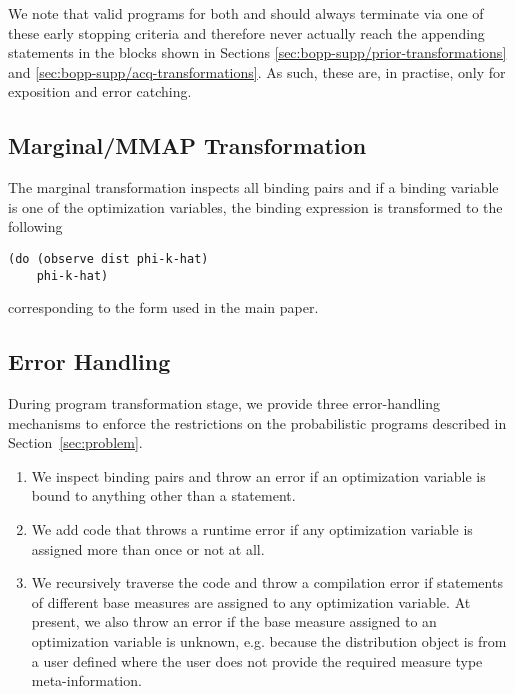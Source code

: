 We note that valid programs for both  and  should always terminate via one of these early stopping criteria and therefore never actually reach the appending statements in the  blocks shown in Sections \ref{sec:bopp-supp/prior-transformations} and \ref{sec:bopp-supp/acq-transformations}.  As such, these are, in practise, only for exposition and error catching.

\subsection{Marginal/MMAP Transformation}
The marginal transformation inspects all  binding pairs and if a binding variable  is one of the optimization variables, the binding expression  is transformed to the following
    \begin{lstlisting}[basicstyle=\footnotesize\ttfamily]
(do (observe dist phi-k-hat)
    phi-k-hat)
    \end{lstlisting}
corresponding to the  form used in the main paper.

\subsection{Error Handling}
During program transformation stage, we provide three error-handling mechanisms to enforce the restrictions on the probabilistic programs described in Section~\ref{sec:problem}.
\begin{enumerate}
    \item We inspect  binding pairs and throw an error if an optimization variable is bound to anything other than a \sample statement.
    \item We add code that throws a runtime error if any optimization variable is assigned more than once or not at all.
    \item We recursively traverse the code and throw a compilation error if \sample statements of different base measures are assigned to any optimization variable.  At present, we also throw an error if the base measure assigned to an optimization variable is unknown, e.g. because the distribution object is from a user defined  where the user does not provide the required measure type meta-information.
\end{enumerate}